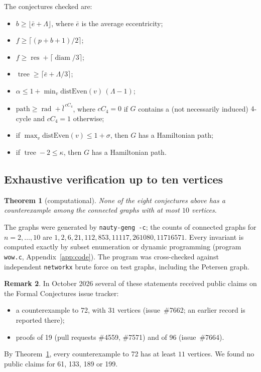 \documentclass[11pt,a4paper]{article}
\newtheorem{theorem}{Theorem}[section]
\theoremstyle{definition}
\newtheorem{remark}[theorem]{Remark}
\newcommand{\res}{\operatorname{res}}
\newcommand{\rad}{\operatorname{rad}}
\newcommand{\diam}{\operatorname{diam}}
\newcommand{\tr}{\operatorname{tree}}
\begin{document}
The conjectures checked are:
\begin{itemize}
\item[19:] $b\ge\lfloor\bar e+\Lambda\rfloor$, where $\bar e$ is the average eccentricity;
\item[40:] $f\ge\lceil(p+b+1)/2\rceil$;
\item[61:] $f\ge\res+\lceil\diam/3\rceil$;
\item[72:] $\tr\ge\lceil\bar e+\Lambda/3\rceil$;
\item[96:] $\alpha\le1+\min_v\mathrm{distEven}(v)\,(\Lambda-1)$;
\item[133:] $\mathrm{path}\ge\rad+\bar l^{\,cC_4}$, where $cC_4=0$ if $G$ contains a
  (not necessarily induced) $4$-cycle and $cC_4=1$ otherwise;
\item[189:] if $\max_v\mathrm{distEven}(v)\le1+\sigma$, then $G$ has a Hamiltonian path;
\item[199:] if $\tr-2\le\kappa$, then $G$ has a Hamiltonian path.
\end{itemize}

\subsection{Exhaustive verification up to ten vertices}
\begin{theorem}[computational]\label{thm:wow}
None of the eight conjectures above has a counterexample among the connected graphs with at
most $10$ vertices.
\end{theorem}
The graphs were generated by \texttt{nauty-geng -c}; the counts of connected graphs for
$n=2,\dots,10$ are $1,2,6,21,112,853,11117,261080,11716571$. Every invariant is computed
exactly by subset enumeration or dynamic programming (program \texttt{wow.c},
Appendix~\ref{app:code}). The program was cross-checked against independent
\texttt{networkx} brute force on test graphs, including the Petersen graph.

\begin{remark}
In October 2026 several of these statements received public claims on the Formal
Conjectures issue tracker:
\begin{itemize}
\item a counterexample to 72, with $31$ vertices (issue~\#7662; an earlier record is
  reported there);
\item proofs of 19 (pull requests \#4559, \#7571) and of 96 (issue~\#7664).
\end{itemize}
By Theorem~\ref{thm:wow}, every counterexample to 72 has at least $11$ vertices. We found no
public claims for 61, 133, 189 or 199.
\end{remark}
\end{document}
